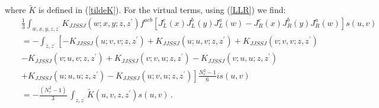 \documentclass[11pt,a4paper]{article}
\begin{document}
where $\tilde K$ is defined in (\ref{tildeK}).
For the virtual terms, using (\ref{LLR})  we find:
\begin{eqnarray}
&&\frac{1}{3}\int_{w,x,y,z,z^{\prime}}K_{JJSSJ}(w;x,y;z,z^{\prime})f^{acb}\left[J_{L}^{c}(x)J_{L}^{b}(y)J_{L}^{a}(w)-J_{R}^{c}(x)J_{R}^{b}(y)J_{R}^{a}(w)\right]s(u,v)\nonumber \\
&&=-\int_{z,z^{\prime}}\left[-K_{JJSSJ}(u;v,v;z,z^{\prime})+K_{JJSSJ}(u;u,v;z,z^{\prime})+K_{JJSSJ}(v;v,v;z,z^{\prime})\right.\nonumber \\
&&-K_{JJSSJ}(v;u,v;z,z^{\prime})+K_{JJSSJ}(v;v,u;z,z^{\prime})-K_{JJSSJ}(v;u,u;z,z^{\prime})\nonumber \\
&&\left.+K_{JJSSJ}(u;u,u;z,z^{\prime})-K_{JJSSJ}(u;v,u;z,z^{\prime})\right]\frac{N_{c}^{2}-1}{6}is(u,v)\nonumber\\
&&=-\frac{(N_{c}^{2}-1)}{3}\,\int_{z,z^{\prime}}\widetilde{K}(u,v,z,z^{\prime})s(u,v)\,.
  \end{eqnarray}
  
\end{document}
